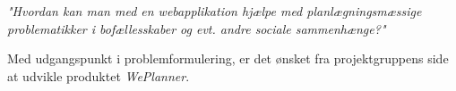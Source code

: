 \begin{center}

\textit{"Hvordan kan man med en webapplikation hjælpe med planlægningsmæssige}\\
\textit{problematikker i bofællesskaber og evt. andre sociale sammenhænge?"}

\end{center}

\noindent Med udgangspunkt i problemformulering, er det ønsket fra projektgruppens side at udvikle produktet \textit{WePlanner}.